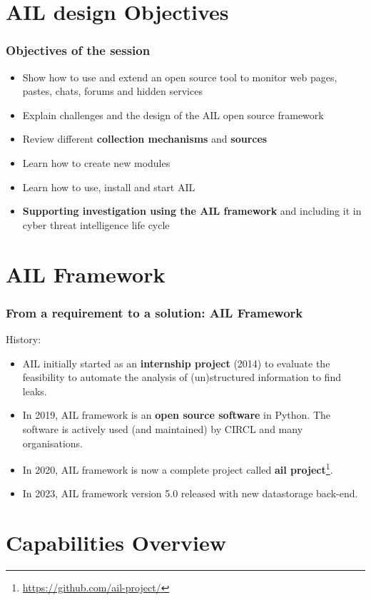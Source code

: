 \documentclass[aspectratio=169]{beamer}
\begin{document}
\section{AIL design Objectives}
\begin{frame}
\frametitle{Objectives of the session}
    \begin{itemize}
        \item Show how to use and extend an open source tool to monitor web pages, pastes, chats, forums and hidden services
        \item Explain challenges and the design of the AIL open source framework
        \item Review different {\bf collection mechanisms} and {\bf sources}
        \item Learn how to create new modules
        \item Learn how to use, install and start AIL
        \item {\bf Supporting investigation using the AIL framework} and including it in cyber threat intelligence life cycle
    \end{itemize}
\end{frame}

\section{AIL Framework}
\begin{frame}
    \frametitle{From a requirement to a solution: AIL Framework}
    \large{History:}
    \begin{itemize}
        \item AIL initially started as an \textbf{internship project} (2014) to evaluate the feasibility to automate the analysis of (un)structured information to find leaks.
        \item In 2019, AIL framework is an \textbf{open source software} in Python. The software is actively used (and maintained) by CIRCL and many organisations.
        \item In 2020, AIL framework is now a complete project called \textbf{ail project}\footnote{\url{https://github.com/ail-project/}}.
        \item In 2023, AIL framework version 5.0 released with new datastorage back-end.
    \end{itemize}
\end{frame}

\section{Capabilities Overview}
\end{document}
